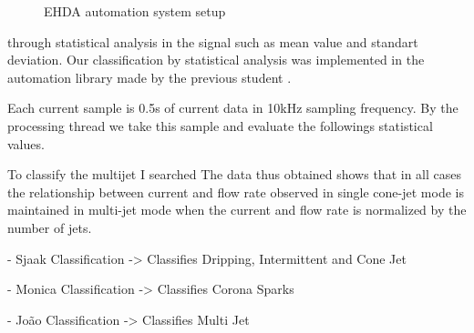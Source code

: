 \begin{figure}[H]
    \centering
    \caption{EHDA automation system setup}
    \label{fig:sjaaks_statistical_class}
\end{figure}

 
 through statistical analysis in the signal such as mean value and standart deviation.
 Our classification by statistical analysis was implemented in the automation library made by the previous student \cite{Monica}.

 Each current sample is 0.5s of current data in 10kHz sampling frequency.
 By the processing thread we take this sample and evaluate the followings statistical values.

To classify the multijet I searched \cite{Ryan} The data thus obtained shows that in all cases the relationship between current and flow rate observed in single cone-jet mode is maintained in multi-jet mode when the current and flow rate is normalized by the number of jets. 

        
        - Sjaak Classification -> Classifies Dripping, Intermittent and Cone Jet
        
        - Monica Classification -> Classifies Corona Sparks

        - João Classification -> Classifies Multi Jet

